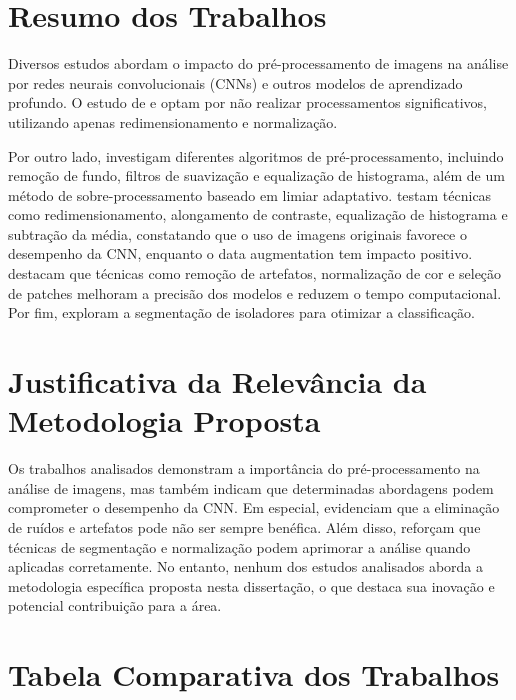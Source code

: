 \section{Resumo dos Trabalhos}

Diversos estudos abordam o impacto do pré-processamento de imagens na análise por redes neurais convolucionais (CNNs) e outros modelos de aprendizado profundo. O estudo de  e  optam por não realizar processamentos significativos, utilizando apenas redimensionamento e normalização.

Por outro lado,  investigam diferentes algoritmos de pré-processamento, incluindo remoção de fundo, filtros de suavização e equalização de histograma, além de um método de sobre-processamento baseado em limiar adaptativo.  testam técnicas como redimensionamento, alongamento de contraste, equalização de histograma e subtração da média, constatando que o uso de imagens originais favorece o desempenho da CNN, enquanto o data augmentation tem impacto positivo.  destacam que técnicas como remoção de artefatos, normalização de cor e seleção de patches melhoram a precisão dos modelos e reduzem o tempo computacional. Por fim,  exploram a segmentação de isoladores para otimizar a classificação.

\section{Justificativa da Relevância da Metodologia Proposta}

Os trabalhos analisados demonstram a importância do pré-processamento na análise de imagens, mas também indicam que determinadas abordagens podem comprometer o desempenho da CNN. Em especial,  evidenciam que a eliminação de ruídos e artefatos pode não ser sempre benéfica. Além disso,  reforçam que técnicas de segmentação e normalização podem aprimorar a análise quando aplicadas corretamente. No entanto, nenhum dos estudos analisados aborda a metodologia específica proposta nesta dissertação, o que destaca sua inovação e potencial contribuição para a área.

\section{Tabela Comparativa dos Trabalhos}

